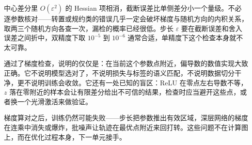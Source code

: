 中心差分里 \(O(\varepsilon^2)\) 的 Hessian 项相消，截断误差比单侧差分小一个量级。不必逐参数核对——转置或规约类的错误几乎一定会破坏梯度与随机方向的内积关系，取两三个随机方向各查一次，漏检的概率已经很低。步长 \(\varepsilon\) 要在截断误差和舍入误差之间折中，双精度下取 \(10^{-5}\) 到 \(10^{-6}\) 通常合适，单精度下这个检查本身就不太可靠。

通过了梯度检查，说明的仅仅是：在当前这个参数点附近，偏导数的数值实现大致正确。它不说明模型选对了，不说明损失与标签的语义匹配，不说明数据切分干净，更不说明训练会收敛。它还有一处已知的盲区：ReLU 在零点左右导数不等，\(z\) 落在零附近的样本会让有限差分给出不可信的结果，检查时应当避开这些点，或者换一个光滑激活来做验证。

梯度算对之后，训练仍然可能失败——步长把参数推出有效区域，深层网络的梯度在连乘中消失或爆炸，批噪声让轨迹在最优点附近来回打转。这些问题不在计算图上，而在优化过程本身，下一单元接手。
